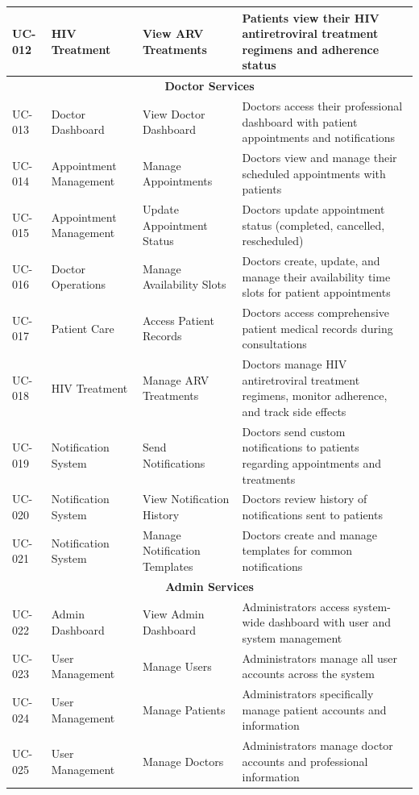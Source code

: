 \documentclass[12pt,a4paper]{article}
\begin{document}
\begin{longtable}{|p{1cm}|p{3cm}|p{3cm}|p{7cm}|}
\hline
UC-012 & HIV Treatment & View ARV Treatments & Patients view their HIV antiretroviral treatment regimens and adherence status \\
\hline
\multicolumn{4}{|c|}{\textbf{Doctor Services}} \\
\hline
UC-013 & Doctor Dashboard & View Doctor Dashboard & Doctors access their professional dashboard with patient appointments and notifications \\
\hline
UC-014 & Appointment Management & Manage Appointments & Doctors view and manage their scheduled appointments with patients \\
\hline
UC-015 & Appointment Management & Update Appointment Status & Doctors update appointment status (completed, cancelled, rescheduled) \\
\hline
UC-016 & Doctor Operations & Manage Availability Slots & Doctors create, update, and manage their availability time slots for patient appointments \\
\hline
UC-017 & Patient Care & Access Patient Records & Doctors access comprehensive patient medical records during consultations \\
\hline
UC-018 & HIV Treatment & Manage ARV Treatments & Doctors manage HIV antiretroviral treatment regimens, monitor adherence, and track side effects \\
\hline
UC-019 & Notification System & Send Notifications & Doctors send custom notifications to patients regarding appointments and treatments \\
\hline
UC-020 & Notification System & View Notification History & Doctors review history of notifications sent to patients \\
\hline
UC-021 & Notification System & Manage Notification Templates & Doctors create and manage templates for common notifications \\
\hline
\multicolumn{4}{|c|}{\textbf{Admin Services}} \\
\hline
UC-022 & Admin Dashboard & View Admin Dashboard & Administrators access system-wide dashboard with user and system management \\
\hline
UC-023 & User Management & Manage Users & Administrators manage all user accounts across the system \\
\hline
UC-024 & User Management & Manage Patients & Administrators specifically manage patient accounts and information \\
\hline
UC-025 & User Management & Manage Doctors & Administrators manage doctor accounts and professional information \\

\end{longtable}
\end{document}
